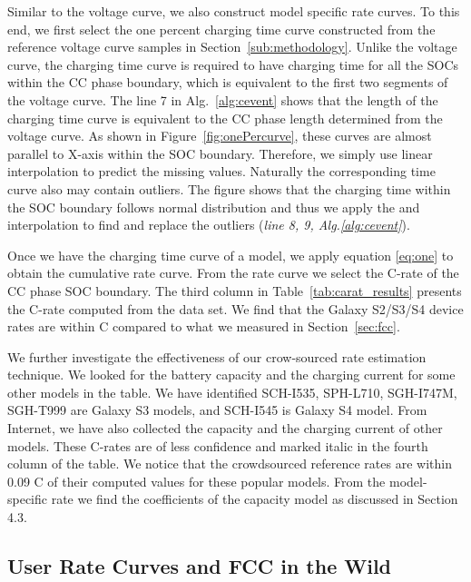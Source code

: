 \documentclass[journal]{IEEEtran}
\begin{document}
Similar to the voltage curve, we also construct model specific  rate curves. To this end, we first select the one percent charging time curve constructed from the reference voltage curve samples in Section~\ref{sub:methodology}. Unlike the voltage curve, the charging time curve is required to have charging time for all the SOCs within the CC phase boundary, which is equivalent to the first two segments of the voltage curve. The line 7 in Alg.~\ref{alg:cevent} shows that the length of the charging time curve is equivalent to the CC phase length determined from the voltage curve.  As shown in Figure~\ref{fig:onePercurve}, these curves are almost parallel to X-axis within the SOC boundary. Therefore, we simply use linear interpolation to predict the missing values. Naturally the corresponding time curve also may contain outliers. The figure shows that the charging time within the SOC boundary follows normal distribution and thus we apply the  and interpolation to find and replace the outliers (\textit{line 8, 9, Alg.\ref{alg:cevent}}). 


Once we have the charging time curve of a model, we apply equation \eqref{eq:one} to obtain the cumulative rate curve. From the rate curve we select the C-rate of the CC phase SOC boundary. The third column in Table~\ref{tab:carat_results} presents the C-rate computed from the data set. We find that the Galaxy S2/S3/S4 device rates are within C compared to what we measured in Section~\ref{sec:fcc}.  

We further investigate the effectiveness of our crow-sourced rate estimation technique. We looked for the battery capacity and the charging current for some other models in the table. We have identified SCH-I535, SPH-L710, SGH-I747M, SGH-T999 are Galaxy S3 models, and SCH-I545 is Galaxy S4 model. From Internet, we have also collected the capacity and the charging current of other models. These C-rates are of less confidence  and  marked italic in the fourth column of the table. We notice  that the crowdsourced reference rates are within 0.09 C of their computed values for these popular models. From the model-specific rate we find the coefficients of the capacity model as discussed in Section 4.3.


\subsection{User Rate Curves and FCC in the Wild}
\label{sub:fcc_loss}
\end{document}
